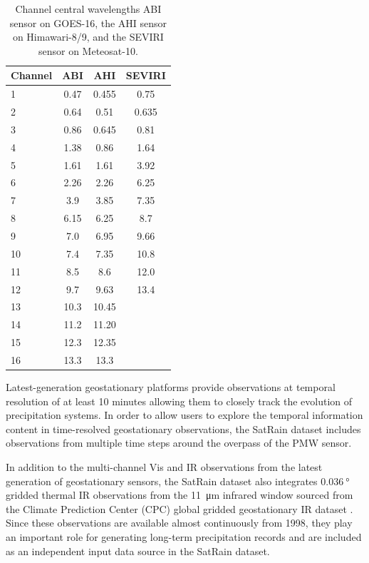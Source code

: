 \documentclass[11pt]{article}
\begin{document}
\begin{table}[htbp]
  \centering
    \begin{tabular}{lccc}
      \toprule
      Channel & ABI & AHI & SEVIRI \\
      \midrule
      1 & 0.47 & 0.455 & 0.75  \\
      2 & 0.64 & 0.51  & 0.635 \\
      3 & 0.86 & 0.645 & 0.81  \\
      4 & 1.38 & 0.86  & 1.64  \\
      5 & 1.61 & 1.61  & 3.92  \\
      6 & 2.26 & 2.26  & 6.25  \\
      7 & 3.9  & 3.85  & 7.35  \\
      8 & 6.15 & 6.25  & 8.7   \\
      9 & 7.0  & 6.95  & 9.66  \\
      10 & 7.4  & 7.35  & 10.8 \\
      11 & 8.5  & 8.6   & 12.0 \\
      12 & 9.7  & 9.63  & 13.4 \\
      13 & 10.3 & 10.45 &    \\
      14 & 11.2 & 11.20 &    \\
      15 & 12.3 & 12.35 &    \\
      16 & 13.3 & 13.3  &    \\
      \bottomrule
	\end{tabular}
	\caption{Channel central wavelengths ABI sensor on GOES-16, the AHI sensor on Himawari-8/9, and the SEVIRI sensor on Meteosat-10.}
	\label{tab:geo_channels}
\end{table}

Latest-generation geostationary platforms provide observations at temporal
resolution of at least 10 minutes allowing them to closely track the evolution of
precipitation systems. In order to allow users to explore the temporal
information content in time-resolved geostationary observations, the SatRain
dataset includes observations from multiple time steps around the overpass of
the PMW sensor.

In addition to the multi-channel Vis and IR observations from the latest
generation of geostationary sensors, the SatRain dataset also integrates
$\SI{0.036}{\degree}$ gridded thermal IR observations from the \SI{11}{\micro \meter}
infrared window sourced from the Climate Prediction Center (CPC) global gridded
geostationary IR dataset \citep{NCEP_CPC_L3_IR}. Since these observations are
available almost continuously from 1998, they play an important role for
generating long-term precipitation records and are included as an independent
input data source in the SatRain dataset.
\end{document}
